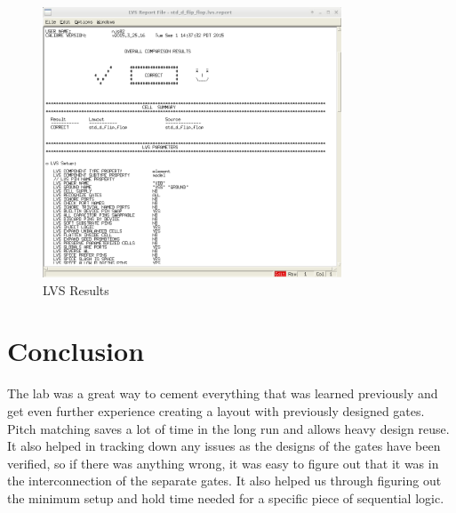 \documentclass[12pt]{article}
\begin{document}
\begin{figure}[!htb]
  \centering
  \includegraphics[width=3.5in]{figures/lvs.png}
  \caption{LVS Results}\label{fig:lvs}
\end{figure}
\clearpage
\section{Conclusion}
The lab was a great way to cement everything that was learned previously and get even further experience
creating a layout with previously designed gates. Pitch matching saves a lot of time in the long run and
allows heavy design reuse. It also helped in tracking down any issues as the designs of the gates have
been verified, so if there was anything wrong, it was easy to figure out that it was in the interconnection
of the separate gates. It also helped us through figuring out the minimum setup and hold time needed for
a specific piece of sequential logic.
\end{document}
